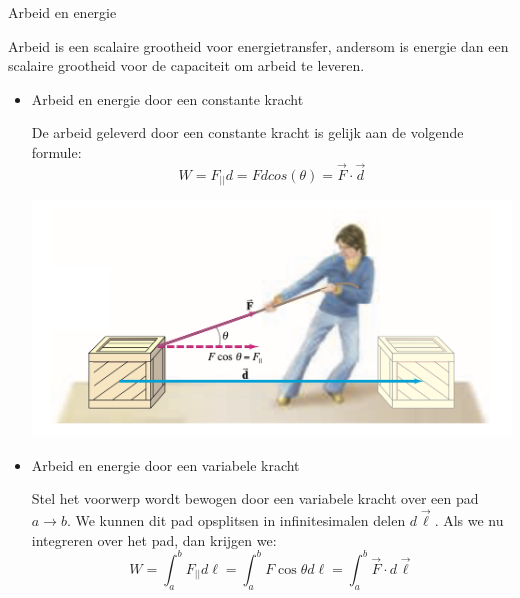\begin{theo}{Arbeid en energie}

    Arbeid is een scalaire grootheid voor energietransfer, andersom is energie dan een scalaire grootheid voor de capaciteit om arbeid te leveren.

    \begin{itemize}
    
        \item{Arbeid en energie door een constante kracht}
        
            De arbeid geleverd door een constante kracht is gelijk aan de volgende formule:
            \begin{equation*}
                W = F_{||}d = Fdcos(\theta) = \Vec{F} \cdot \Vec{d}
            \end{equation*}
            \begin{center}
                \includegraphics[scale = 0.15]{Images/Dynamica/Arbeid bij constante kracht.png}
            \end{center}
        \item{Arbeid en energie door een variabele kracht}
        
            Stel het voorwerp wordt bewogen door een variabele kracht over een pad $ a \to b $. We kunnen dit pad opsplitsen in infinitesimalen delen $ d\Vec{\ell} $. Als we nu integreren over het pad, dan krijgen we: 
            \begin{equation*}
                W = \int_{a}^{b}  F_{||}d\ell = \int_{a}^{b} F \cos\theta d\ell = \int_{a}^{b} \Vec{F} \cdot d\Vec{\ell}
            \end{equation*}
    \end{itemize}
    \vspace{-0.3cm}
\end{theo}

